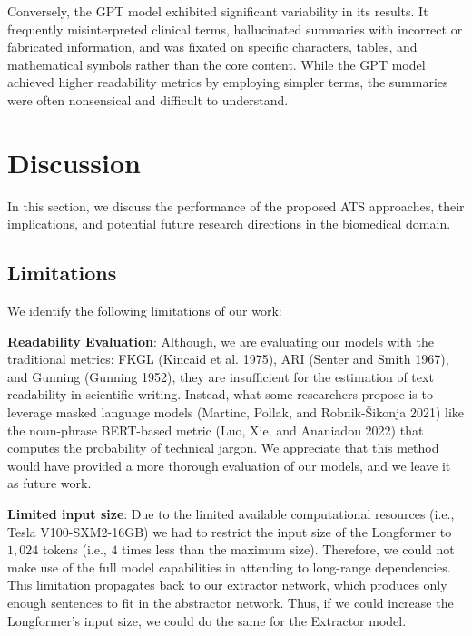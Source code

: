 \documentclass[
]{article}
\begin{document}
Conversely, the GPT model exhibited significant variability in its
results. It frequently misinterpreted clinical terms, hallucinated
summaries with incorrect or fabricated information, and was fixated on
specific characters, tables, and mathematical symbols rather than the
core content. While the GPT model achieved higher readability metrics by
employing simpler terms, the summaries were often nonsensical and
difficult to understand.

\hypertarget{sec:discussion-conclusion}{%
\section{Discussion}\label{sec:discussion-conclusion}}

In this section, we discuss the performance of the proposed ATS
approaches, their implications, and potential future research directions
in the biomedical domain.

\hypertarget{sec:limitations}{%
\subsection{Limitations}\label{sec:limitations}}

We identify the following limitations of our work:

\textbf{Readability Evaluation}: Although, we are evaluating our models
with the traditional metrics: FKGL (Kincaid et al. 1975), ARI (Senter
and Smith 1967), and Gunning (Gunning 1952), they are insufficient for
the estimation of text readability in scientific writing. Instead, what
some researchers propose is to leverage masked language models (Martinc,
Pollak, and Robnik-Šikonja 2021) like the noun-phrase BERT-based metric
(Luo, Xie, and Ananiadou 2022) that computes the probability of
technical jargon. We appreciate that this method would have provided a
more thorough evaluation of our models, and we leave it as future work.

\textbf{Limited input size}: Due to the limited available computational
resources (i.e., Tesla V100-SXM2-16GB) we had to restrict the input size
of the Longformer to \(1,024\) tokens (i.e., \(4\) times less than the
maximum size). Therefore, we could not make use of the full model
capabilities in attending to long-range dependencies. This limitation
propagates back to our extractor network, which produces only enough
sentences to fit in the abstractor network. Thus, if we could increase
the Longformer's input size, we could do the same for the Extractor
model.
\end{document}
